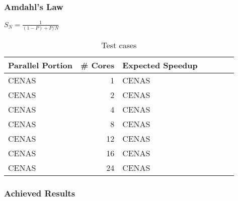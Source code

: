 \documentclass{beamer}
\begin{document}
\begin{frame}
	\frametitle{Amdahl's Law}
	\begin{enumerate}
		
		$S_{N}=\frac{1}{(1-P) + P/N}$

		\begin{center}
			\begin{table}[!htp]
			\begin{tabular}{lrlrlrl}
			\hline
			\textbf{Parallel Portion} & \textbf{\# Cores} & \textbf{Expected Speedup}\\
			\hline
			CENAS & 1 & CENAS \\
			CENAS & 2 & CENAS \\
			CENAS & 4 & CENAS \\
			CENAS & 8 & CENAS \\
			CENAS & 12 & CENAS \\
			CENAS & 16 & CENAS \\
			CENAS & 24 & CENAS \\
			\hline
			\end{tabular}
			\caption{Test cases}
			\label{tab:testcases}
			\end{table}
		\end{center}	
	\end{enumerate}
\end{frame}

\begin{frame}
	\frametitle{Achieved Results}
	\begin{figure}[!htp]
	\label{fig:optm_papi}
	\end{figure}
\end{frame}


\end{document}
